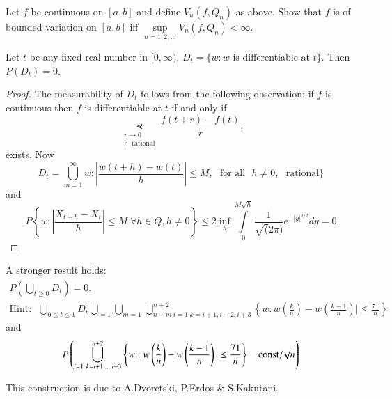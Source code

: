 \begin{exer*}
Let $f$ be continuous on $[a,b]$ and define $V_{n}(f,Q_{n})$ as
above. Show that $f$ is of bounded variation on $[a,b]$ iff
$\sup\limits_{n=1,2,\ldots}V_{n}(f,Q_{n})<\infty$. 
\end{exer*}

\begin{theorem*}
Let $t$ be any fixed real number in $[0,\infty)$, $D_{t}=\{w:w$ is
  differentiable at $t\}$. Then $P(D_{t})=0$.
\end{theorem*}

\begin{proof}
The measurability of $D_{t}$ follows from the following observation:
if $f$ is continuous then $f$ is differentiable at $t$ if and only if
$$
\Lt\limits_{\substack{r\to 0\\ r\text{~
      rational}}}\frac{f(t+r)-f(t)}{r}.
$$
exists. Now
$$
D_{t}=\bigcup\limits^{\infty}_{m=1}w:|\frac{w(t+h)-w(t)}{h}|\leq
M,\text{~ for all~ } h\neq 0,\text{~ rational}\}
$$
and 
$$
P\left\{w:|\frac{X_{t+h}-X_{t}}{h}|\leq M\;\forall h\in Q, h\neq 
0\right\}\leq 2\inf\limits_{h}\int\limits^{M\surd
  h}_{0}\frac{1}{\surd(2\pi)}e^{-|y|^{2/2}}dy=0 
$$
\end{proof}

\begin{remark*}
A stronger result holds:
\begin{gather*}
P\left(\bigcup\limits_{t\geq 0}D_{t}\right)=0.\\
\text{Hint:~ }\bigcup\limits_{0\leq t\leq
  1}D_{t}\bigcup\limits_{=1}\bigcup\limits_{m=1}\bigcup\limits^{n+2}_{n-m\ i=1\ k=i+1,i+2,i+3}\left\{w:w\left(\frac{k}{n}\right)-w\left(\frac{k-1}{n}\right)|\leq \frac{71}{n}\right\}
\end{gather*}
and
$$
P\left(\bigcup\limits^{n+2}_{i=1\ k=i+1,\ldots,i+3}\left\{w:w\left(\frac{k}{n}\right)-w\left(\frac{k-1}{n}\right)|\leq\frac{71}{n}\right\}\q
  \text{const}/\surd n\right)
$$

This construction is due to A.\@ Dvoretski, P.\@ Erdos \& S.\@ Kakutani.
\end{remark*}





